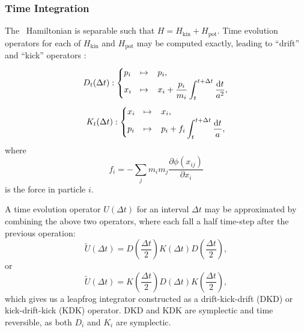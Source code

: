 \subsubsection{Time Integration}
\label{subsubsec:gadget--gadget--time_integration}


The \nbody\ Hamiltonian is separable such that $H = H_{\mathrm{kin}} + H_{\mathrm{pot}}$.  Time evolution operators for each of $H_{\mathrm{kin}}$ and $H_{\mathrm{pot}}$ may be computed exactly, leading to ``drift'' and ``kick'' operators \citep{1997astro.ph.10043Q}:
\begin{equation}
	D_{t}(\Delta t):
	\begin{cases}
		p_{i} & \mapsto \; \; \; p_{i}, \\
		x_{i} & \mapsto \; \; \; x_{i} + \displaystyle \frac{p_{i}}{m_{i}} \displaystyle \int_{t}^{t + \Delta t} \frac{{\rm {d}} t}{a^{2}},
	\end{cases}
\end{equation}
\begin{equation}
	K_{t}(\Delta t):
	\begin{cases}
		x_{i} & \mapsto \; \; \; x_{i}, \\
		p_{i} & \mapsto \; \; \; p_{i} + f_{i} \displaystyle \int_{t}^{t + \Delta t} \frac{{\rm {d}} t}{a},
	\end{cases}
\end{equation}
where
\begin{equation}
	f_{i} = -\sum_{j} m_{i} m_{j} \frac{\partial \phi(x_{ij})}{\partial x_{i}}
\end{equation}
is the force in particle $i$.

A time evolution operator $U(\Delta t)$ for an interval $\Delta t$  may be approximated by combining the above two operators, where each fall a half time-step after the previous operation:
\begin{equation}
	\tilde{U}(\Delta t) = D \left( \frac{\Delta t}{2} \right) K(\Delta t) D \left( \frac{\Delta t}{2} \right),
\end{equation}
or
\begin{equation}
	\tilde{U}(\Delta t) = K \left( \frac{\Delta t}{2} \right) D(\Delta t) K \left( \frac{\Delta t}{2} \right),
\end{equation}
which gives us a leapfrog integrator constructed as a drift-kick-drift (DKD) or kick-drift-kick (KDK) operator.  DKD and KDK are symplectic and time reversible, as both $D_{i}$ and $K_{i}$ are symplectic.

